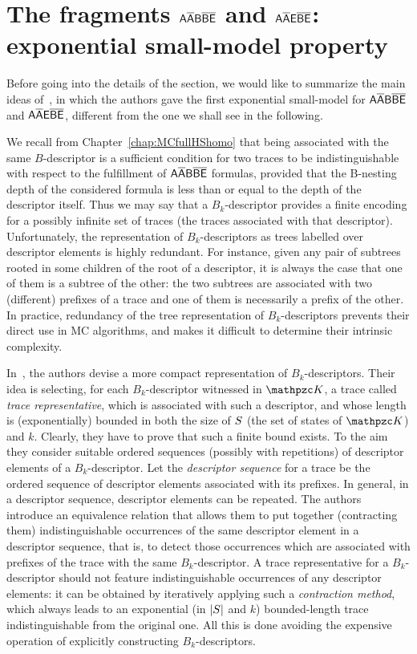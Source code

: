 \section{The fragments $\mathsf{A\overline{A}B\overline{B}\overline{E}}$ and $\mathsf{A\overline{A}E\overline{B}\overline{E}}$: ex\-po\-nen\-tial small-model property}\label{sec:AAbarBBbarEbar}

Before going into the details of the section, we would like to summarize the main ideas of~\cite{MMP15},
in which the authors gave the first exponential small-model for $\mathsf{A\overline{A}B\overline{B}\overline{E}}$ and $\mathsf{A\overline{A}E\overline{B}\overline{E}}$, different from the one we shall see in the following.

We recall from Chapter~\ref{chap:MCfullHShomo} that
being associated with the same $B$-descriptor is a sufficient condition for two traces to be indistinguishable with respect to the fulfillment of $\mathsf{A\overline{A}B\overline{B}\overline{E}}$ formulas, provided that the B-nesting depth of the considered formula is less than or equal to the depth of the descriptor itself. 
Thus we may say that a $B_k$-descriptor provides a finite encoding for a possibly infinite set of traces (the traces associated with that descriptor). Unfortunately, the representation of $B_k$-descriptors as trees labelled over descriptor elements is highly redundant. For instance, given any pair of subtrees rooted in some children of the root of a descriptor, it is always the case that one of them is a subtree of the other:
the two subtrees are associated with two (different) prefixes of a trace and one of them is necessarily a prefix of the other. In practice, redundancy of the tree representation of $B_k$-descriptors prevents their direct use in MC algorithms, and makes it difficult to determine their intrinsic complexity.

In~\cite{MMP15}, the authors 
devise a more compact representation of $B_k$-de\-scrip\-tors. 
Their idea is selecting,
for each $B_k$-descriptor witnessed in $\Ku$, a trace called \emph{trace representative}, which is associated with such a descriptor, and whose length is (exponentially) bounded in both the size of $S$ (the set of states of $\Ku$) and $k$. 
Clearly, they have to prove that 
such a finite bound exists. To the aim they consider suitable ordered sequences (possibly with repetitions) of descriptor elements of a $B_k$-descriptor. Let the \emph{descriptor sequence} for a trace be the ordered sequence of descriptor elements associated with its prefixes. In general, in a descriptor sequence, descriptor elements can be repeated. The authors introduce an equivalence relation that allows them to put together (contracting them) indistinguishable
occurrences of the same descriptor element in a descriptor sequence, that is, 
to detect those occurrences which are associated with prefixes of the trace
with the same $B_{k}$-descriptor. 
A trace representative for a $B_{k}$-descriptor should not feature indistinguishable occurrences of any descriptor elements: 
it can be obtained by iteratively applying such a \emph{contraction method}, which always leads to an exponential (in $|S|$ and $k$) bounded-length trace indistinguishable from the original one. 
All this is done avoiding the expensive operation of explicitly constructing $B_k$-descriptors.


